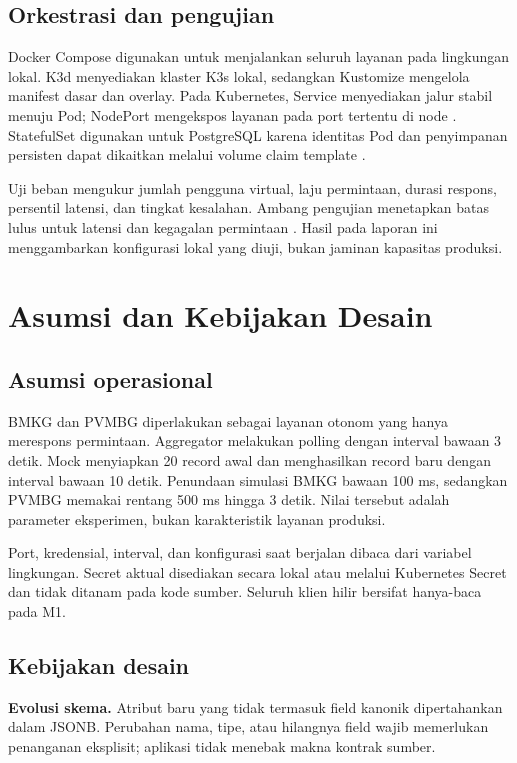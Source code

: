 \documentclass{fairmeta}
\begin{document}
\subsection{Orkestrasi dan pengujian}

Docker Compose digunakan untuk menjalankan seluruh layanan pada lingkungan lokal. K3d menyediakan klaster K3s lokal, sedangkan Kustomize mengelola manifest dasar dan overlay. Pada Kubernetes, Service menyediakan jalur stabil menuju Pod; NodePort mengekspos layanan pada port tertentu di node \cite{kubernetes-service}. StatefulSet digunakan untuk PostgreSQL karena identitas Pod dan penyimpanan persisten dapat dikaitkan melalui volume claim template \cite{kubernetes-statefulset}.

Uji beban mengukur jumlah pengguna virtual, laju permintaan, durasi respons, persentil latensi, dan tingkat kesalahan. Ambang pengujian menetapkan batas lulus untuk latensi dan kegagalan permintaan \cite{k6-thresholds}. Hasil pada laporan ini menggambarkan konfigurasi lokal yang diuji, bukan jaminan kapasitas produksi.

\section{Asumsi dan Kebijakan Desain}

\subsection{Asumsi operasional}

BMKG dan PVMBG diperlakukan sebagai layanan otonom yang hanya merespons permintaan. Aggregator melakukan polling dengan interval bawaan 3 detik. Mock menyiapkan 20 record awal dan menghasilkan record baru dengan interval bawaan 10 detik. Penundaan simulasi BMKG bawaan 100 ms, sedangkan PVMBG memakai rentang 500 ms hingga 3 detik. Nilai tersebut adalah parameter eksperimen, bukan karakteristik layanan produksi.

Port, kredensial, interval, dan konfigurasi saat berjalan dibaca dari variabel lingkungan. Secret aktual disediakan secara lokal atau melalui Kubernetes Secret dan tidak ditanam pada kode sumber. Seluruh klien hilir bersifat hanya-baca pada M1.

\subsection{Kebijakan desain}


\textbf{Evolusi skema.} Atribut baru yang tidak termasuk field kanonik dipertahankan dalam JSONB. Perubahan nama, tipe, atau hilangnya field wajib memerlukan penanganan eksplisit; aplikasi tidak menebak makna kontrak sumber.
\end{document}

